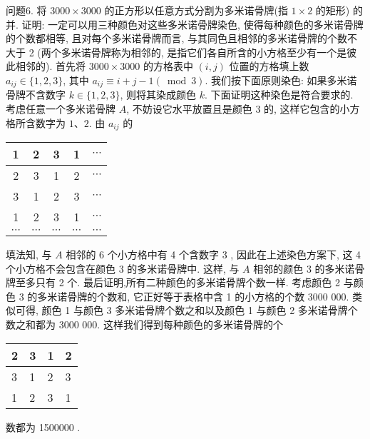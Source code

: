 问题6. 将 $3000 \times 3000$ 的正方形以任意方式分割为多米诺骨牌(指 $1 \times 2$ 的矩形) 的并.
证明: 一定可以用三种颜色对这些多米诺骨牌染色, 使得每种颜色的多米诺骨牌的个数都相等, 且对每个多米诺骨牌而言, 与其同色且相邻的多米诺骨牌的个数不大于 2 (两个多米诺骨牌称为相邻的, 是指它们各自所含的小方格至少有一个是彼此相邻的). 
首先将 $3000 \times 3000$ 的方格表中 $(i, j)$ 位置的方格填上数 $a_{i j} \in\{1,2,3\}$, 其中 $a_{i j} \equiv i+j-1(\bmod 3)$.
我们按下面原则染色: 如果多米诺骨牌不含数字 $k \in \{1,2,3\}$, 则将其染成颜色 $k$. 下面证明这种染色是符合要求的.
考虑任意一个多米诺骨牌 $A$, 不妨设它水平放置且是颜色 3 的, 这样它包含的小方格所含数字为 $1 、 2$. 由 $a_{i j}$ 的
\begin{tabular}{|c|c|c|c|c|}
\hline 1 & 2 & 3 & 1 & $\cdots$ \\
\hline 2 & 3 & 1 & 2 & $\cdots$ \\
\hline 3 & 1 & 2 & 3 & $\cdots$ \\
\hline 1 & 2 & 3 & 1 & $\cdots$ \\
\hline$\cdots$ & $\cdots$ & $\cdots$ & $\cdots$ & $\cdots$ \\
\hline
\end{tabular}
填法知, 与 $A$ 相邻的 6 个小方格中有 4 个含数字 3 , 因此在上述染色方案下, 这 4 个小方格不会包含在颜色 3 的多米诺骨牌中.
这样, 与 $A$ 相邻的颜色 3 的多米诺骨牌至多只有 2 个.
最后证明,所有二种颜色的多米诺骨牌个数一样.
考虑颜色 2 与颜色 3 的多米诺骨牌的个数和, 它正好等于表格中含 1 的小方格的个数 3000 000. 类似可得, 颜色 1 与颜色 3 多米诺骨牌个数之和以及颜色 1 与颜色 2 多米诺骨牌个数之和都为 3000 000. 这样我们得到每种颜色的多米诺骨牌的个
\begin{tabular}{|l|l|l|l|}
\hline 2 & 3 & 1 & 2 \\
\hline 3 & 1 & 2 & 3 \\
\hline 1 & 2 & 3 & 1 \\
\hline
\end{tabular}
数都为 1500000 .


